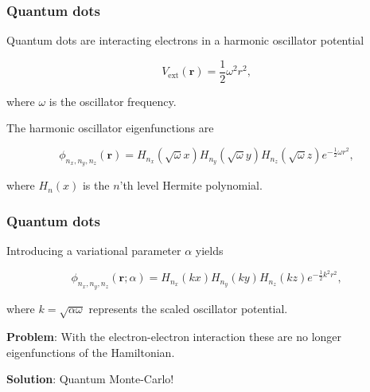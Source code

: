 \begin{frame}
 \frametitle{Quantum dots}
 
 Quantum dots are interacting electrons in a harmonic oscillator potential
 
 \begin{equation}
  V_\mathrm{ext}(\mathbf{r}) = \frac{1}{2}\omega^2r^2,
 \end{equation}
 
 where $\omega$ is the oscillator frequency.
 
 \pause
 
 The harmonic oscillator eigenfunctions are
 
 \begin{equation}
  \phi_{n_x, n_y, n_z}(\mathbf{r}) = H_{n_x}(\sqrt{\omega}x)H_{n_y}(\sqrt{\omega}y)H_{n_z}(\sqrt{\omega}z)e^{-\frac{1}{2}\omega r^2},
 \end{equation}
 
 where $H_n(x)$ is the $n$'th level Hermite polynomial.


 
\end{frame}

\begin{frame}
 \frametitle{Quantum dots}
 
 Introducing a variational parameter $\alpha$ yields
 
 \begin{equation}
  \phi_{n_x, n_y, n_z}(\mathbf{r}; \alpha) = H_{n_x}(kx)H_{n_y}(ky)H_{n_z}(kz)e^{-\frac{1}{2}k^2r^2},
 \end{equation}
 
 where $k = \sqrt{\alpha\omega}$ represents the scaled oscillator potential.
 \shift

 \textbf{Problem}: With the electron-electron interaction these are no longer eigenfunctions of the Hamiltonian.
 \shift
 
 \textbf{Solution}: Quantum Monte-Carlo!
 
\end{frame}

